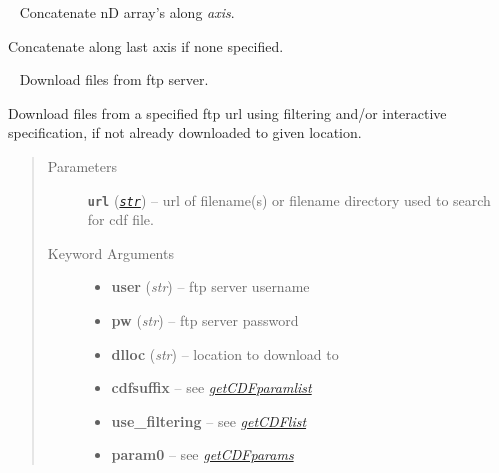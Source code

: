 \documentclass[letterpaper,10pt,english]{sphinxhowto}
\begin{document}

\begin{fulllineitems}
\label{swtools_doc:swtools.concatenate_values}~\label{swtools_doc:concatenate-values}
Concatenate nD array's along \emph{axis}.

Concatenate along last axis if none specified.

\end{fulllineitems}


\begin{fulllineitems}
\label{swtools_doc:swtools.dl_ftp}~\label{swtools_doc:dl-ftp}
Download files from ftp server.

Download files from a specified ftp url using filtering and/or
interactive specification, if not already downloaded to given location.
\begin{quote}\begin{description}
\item[{Parameters}] \leavevmode
\textbf{\texttt{url}} (\href{https://docs.python.org/library/functions.html\#str}{\emph{\texttt{str}}}) -- url of filename(s) or filename directory used to search for cdf file.

\item[{Keyword Arguments}] \leavevmode\begin{itemize}
\item {} 
\textbf{user} (\emph{str}) --
ftp server username

\item {} 
\textbf{pw} (\emph{str}) --
ftp server password

\item {} 
\textbf{dlloc} (\emph{str}) --
location to download to

\item {} 
\textbf{cdfsuffix} --
see {\hyperref[swtools_doc:getcdfparamlist]{\emph{getCDFparamlist}}}

\item {} 
\textbf{use\_filtering} --
see {\hyperref[swtools_doc:getcdflist]{\emph{getCDFlist}}}

\item {} 
\textbf{param0} --
see {\hyperref[swtools_doc:getcdfparams]{\emph{getCDFparams}}}


\end{itemize}
\end{description}
\end{quote}
\end{fulllineitems}
\end{document}
